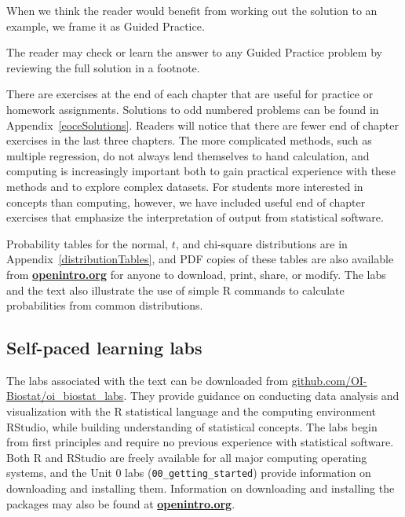 \noindent%
When we think the reader would benefit from working out 
the solution to an example, we frame it as Guided Practice.

\begin{exercisewrap}
\begin{nexercise}
The reader may check or learn the answer to any Guided Practice
problem by reviewing the full solution in a footnote.\footnotemark{}
\end{nexercise}
\end{exercisewrap}

There are exercises at the end of each chapter that are useful for practice or homework assignments. Solutions to odd numbered problems can be found in Appendix~\ref{eoceSolutions}. Readers will notice that there are fewer end of chapter exercises in the last three chapters.  The more complicated methods, such as multiple regression, do not always lend themselves to hand calculation, and computing is increasingly important both to gain practical experience with these methods and to explore complex datasets. For students more interested in concepts than computing, however, we have included useful end of chapter exercises that emphasize the interpretation of output from statistical software.

Probability tables for the normal, $t$, and chi-square distributions are in Appendix~\ref{distributionTables}, and PDF copies of these tables are also available from \href{http://www.openintro.org}{\color{black}\textbf{openintro.org}} for anyone to download, print, share, or modify.  The labs and the text also illustrate the use of simple \textsf{R} commands to calculate probabilities from common distributions.

\subsection*{Self-paced learning labs}

The labs associated with the text can be downloaded from \url{github.com/OI-Biostat/oi_biostat_labs}.  They provide guidance on conducting data analysis and visualization with the \textsf{R} statistical language and the computing environment RStudio, while building understanding of statistical concepts.  The labs begin from first principles and require no previous experience with statistical software. Both \textsf{R} and RStudio are freely available for all major computing operating systems, and the Unit 0 labs (\texttt{00\_getting\_started}) provide information on downloading and installing them. Information on downloading and installing the packages may also be found at \href{http://www.openintro.org}{\color{black}\textbf{openintro.org}}. 

